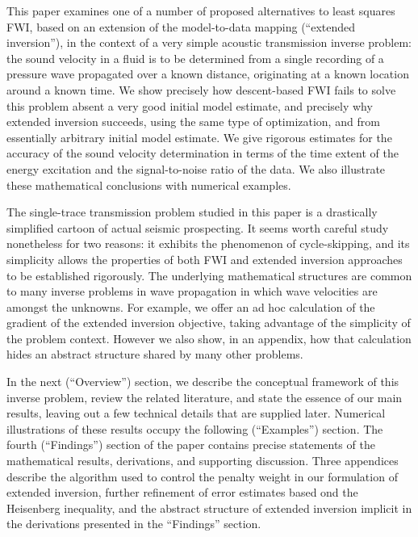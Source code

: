 This paper examines one of a number of proposed alternatives to least
squares FWI, based on an extension of the model-to-data mapping
(``extended inversion''), in the context of 
a very simple acoustic transmission inverse problem: the sound
velocity in a fluid is to be determined from a single recording of a
pressure wave propagated over a known distance, originating at a known
location around a known time. We show precisely
how descent-based FWI fails to solve this problem absent a very good
initial model estimate, and precisely why extended inversion succeeds, using the same type
of optimization, and from essentially arbitrary initial model
estimate. We give rigorous estimates for the accuracy of the sound
velocity determination in terms of the time extent of the energy
excitation and the signal-to-noise ratio of the data. We also illustrate
these mathematical conclusions with numerical
examples.

The single-trace transmission problem studied in this paper is a
drastically simplified cartoon of actual seismic prospecting. It seems
worth careful study nonetheless for two reasons: it exhibits the
phenomenon of cycle-skipping, and its simplicity allows the properties
of both FWI and extended inversion approaches to be established
rigorously. The underlying mathematical structures are common to many
inverse problems in wave propagation in which wave velocities are
amongst the unknowns. For example, we offer an ad hoc calculation of
the gradient of the extended inversion objective, taking advantage of
the simplicity of the problem context. However we also show, in an
appendix, how that calculation hides an abstract structure shared by
many other problems.%

In the next (``Overview'') section, we describe the conceptual
framework of this inverse problem, review the related literature, and
state the essence of our main results, leaving out a few technical
details that are supplied later. Numerical illustrations of these
results occupy the following (``Examples'') section. The fourth
(``Findings'') section of the paper contains precise statements of the
mathematical results, derivations, and supporting discussion. Three
appendices describe the algorithm used to control the penalty weight
in our formulation of extended inversion, further refinement of error
estimates based ond the Heisenberg inequality, and the abstract
structure of extended inversion implicit in the derivations presented
in the ``Findings'' section.

